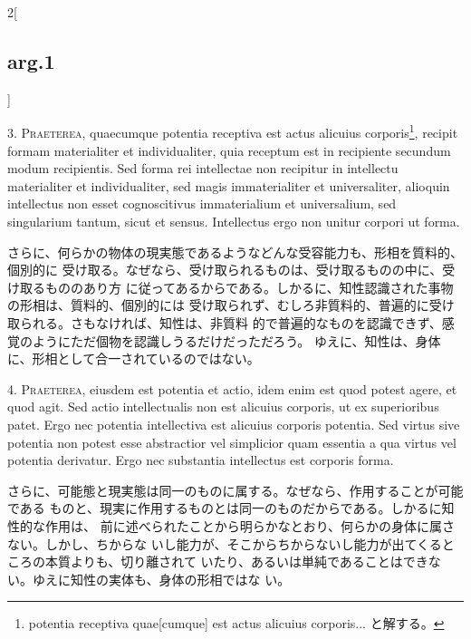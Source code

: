 \documentclass[paper=a4paper,fontsize=10pt,jafontsize=9pt,titlepage]{jlreq}
\begin{document}
\begin{paracol}{2}[\subsection{arg.1}]
 

3. {\scshape Praeterea}, quaecumque potentia receptiva est actus alicuius
corporis\footnote{potentia receptiva quae[cumque] est actus alicuius
  corporis... と解する。}, recipit formam materialiter et individualiter, quia
receptum est in recipiente secundum modum recipientis. Sed forma rei intellectae
non recipitur in intellectu materialiter et individualiter, sed magis
immaterialiter et universaliter, alioquin intellectus non esset cognoscitivus
immaterialium et universalium, sed singularium tantum, sicut et
sensus. Intellectus ergo non unitur corpori ut forma.
 
\switchcolumn

さらに、何らかの物体の現実態であるようなどんな受容能力も、形相を質料的、個別的に
受け取る。なぜなら、受け取られるものは、受け取るものの中に、受け取るもののあり方
に従ってあるからである。しかるに、知性認識された事物の形相は、質料的、個別的には
受け取られず、むしろ非質料的、普遍的に受け取られる。さもなければ、知性は、非質料
的で普遍的なものを認識できず、感覚のようにただ個物を認識しうるだけだっただろう。
ゆえに、知性は、身体に、形相として合一されているのではない。
 

4. {\scshape Praeterea}, eiusdem est potentia et actio, idem enim est quod
potest agere, et quod agit. Sed actio intellectualis non est alicuius corporis,
ut ex superioribus patet. Ergo nec potentia intellectiva est alicuius corporis
potentia. Sed virtus sive potentia non potest esse abstractior vel simplicior
quam essentia a qua virtus vel potentia derivatur. Ergo nec substantia
intellectus est corporis forma.
 
\switchcolumn

 さらに、可能態と現実態は同一のものに属する。なぜなら、作用することが可能である
 ものと、現実に作用するものとは同一のものだからである。しかるに知性的な作用は、
 前に述べられたことから明らかなとおり、何らかの身体に属さない。しかし、ちからな
 いし能力が、そこからちからないし能力が出てくるところの本質よりも、切り離されて
 いたり、あるいは単純であることはできない。ゆえに知性の実体も、身体の形相ではな
 い。
 

\end{paracol}
\end{document}
